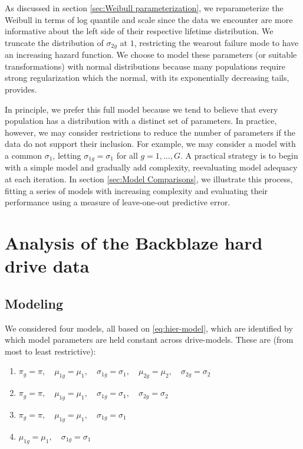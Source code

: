 \documentclass[12pt]{article}
\begin{document}
As discussed in section \ref{sec:Weibull parameterization}, we reparameterize the Weibull in terms of log quantile and scale since the data we encounter are more informative about the left side of their respective lifetime distribution. We truncate the distribution of $\sigma_{2g}$ at $1$, restricting the wearout failure mode to have an increasing hazard function. We choose to model these parameters (or suitable transformations) with normal distributions because many populations require strong regularization which the normal, with its exponentially decreasing tails, provides. 

In principle, we prefer this full model because we tend to believe that every population has a distribution with a distinct set of parameters. In practice, however, we may consider restrictions to reduce the number of parameters if the data do not support their inclusion. For example, we may consider a model with a common $\sigma_{1}$, letting $\sigma_{1g}=\sigma_1$ for all $g=1,\ldots,G$. A practical strategy is to begin with a simple model and gradually add complexity, reevaluating model adequacy at each iteration. In section \ref{sec:Model Comparisons}, we illustrate this process, fitting a series of models with increasing complexity and evaluating their performance using a measure of leave-one-out predictive error.


\section{Analysis of the Backblaze hard drive data}
\label{sec:Data analysis}
\subsection{Modeling}
We considered four models, all based on \ref{eq:hier-model}, which are identified by which model parameters are held constant across drive-models. These are (from most to least restrictive):

\begin{enumerate}
\item $\pi_{g} = \pi,\quad \mu_{1g} = \mu_1,\quad \sigma_{1g}=\sigma_1,\quad \mu_{2g} = \mu_2,\quad \sigma_{2g} = \sigma_2$
\item $\pi_{g} = \pi,\quad \mu_{1g} = \mu_1,\quad \sigma_{1g}=\sigma_1,\quad \sigma_{2g} = \sigma_2$
\item $\pi_{g} = \pi,\quad \mu_{1g} = \mu_1,\quad \sigma_{1g}=\sigma_1$
\item $\mu_{1g} = \mu_1,\quad \sigma_{1g}=\sigma_1$
\end{enumerate}
\end{document}
